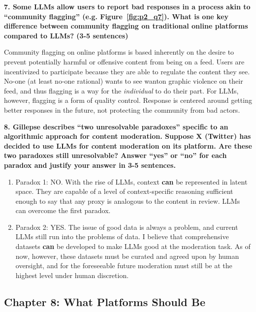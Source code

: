 \documentclass{article}
\begin{document}
\textbf{7. Some LLMs allow users to report bad responses in a process akin to ``community flagging'' (e.g. Figure~\ref{fig:p2_q7}). What is one key difference between community flagging on traditional online platforms compared to LLMs? (3-5 sentences)}

\bigskip
\begin{mdframed}
Community flagging on online platforms is based inherently on the desire to prevent potentially harmful or offensive content from being on a feed. Users are incentivized to participate because they are able to regulate the content they see. No-one (at least no-one rational) wants to see wanton graphic violence on their feed, and thus flagging is a way for the \textit{individual} to do their part. For LLMs, however, flagging is a form of quality control. Response is centered around getting better responses in the future, not protecting the community from bad actors. 
\end{mdframed}

\bigskip

\textbf{8. Gillepse describes ``two unresolvable paradoxes'' specific to an algorithmic approach for content moderation. Suppose X (Twitter) has decided to use LLMs for content moderation on its platform. Are these two paradoxes still unresolvable? Answer ``yes'' or ``no'' for each paradox and justify your answer in 3-5 sentences.}

\bigskip
\begin{mdframed}
\begin{enumerate}
    \item Paradox 1: NO. With the rise of LLMs, context \textbf{can} be represented in latent space. They are capable of a level of context-specific reasoning sufficient enough to say that any proxy is analogous to the content in review. LLMs can overcome the first paradox.
    \item Paradox 2: YES. The issue of good data is always a problem, and current LLMs still run into the problems of data. I believe that comprehensive datasets \textbf{can} be developed to make LLMs good at the moderation task. As of now, however, these datasets must be curated and agreed upon by human oversight, and for the foreseeable future moderation must still be at the highest level under human discretion.  
\end{enumerate}

\end{mdframed}


\subsection*{Chapter 8: What Platforms Should Be}
\end{document}
